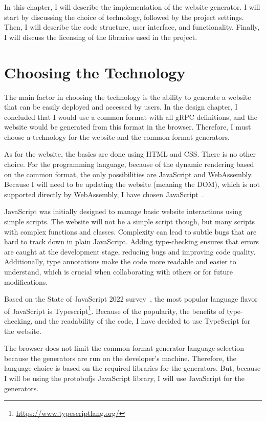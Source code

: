 In this chapter, I will describe the implementation of the website generator.
I will start by discussing the choice of technology, followed by the project settings.
Then, I will describe the code structure, user interface, and functionality.
Finally, I will discuss the licensing of the libraries used in the project.


\section{Choosing the Technology}
The main factor in choosing the technology is the ability to generate a website that can be easily deployed and accessed by users.
In the design chapter, I concluded that I would use a common format with all gRPC definitions, and the website would be generated from this format in the browser.
Therefore, I must choose a technology for the website and the common format generators.

As for the website, the basics are done using HTML and CSS\@.
There is no other choice.
For the programming language, because of the dynamic rendering based on the common format, the only possibilities are JavaScript and WebAssembly.
Because I will need to be updating the website (meaning the DOM), which is not supported directly by WebAssembly, I have chosen JavaScript~\cite{webassembly-dom}.

JavaScript was initially designed to manage basic website interactions using simple scripts.
The website will not be a simple script though, but many scripts with complex functions and classes.
Complexity can lead to subtle bugs that are hard to track down in plain JavaScript.
Adding type-checking ensures that errors are caught at the development stage, reducing bugs and improving code quality.
Additionally, type annotations make the code more readable and easier to understand, which is crucial when collaborating with others or for future modifications.
\cite{typescript-why-create}

Based on the State of JavaScript 2022 survey~\cite{state-of-js-other-tools}, the most popular language flavor of JavaScript is Typescript\footnote{\url{https://www.typescriptlang.org/}}.
Because of the popularity, the benefits of type-checking, and the readability of the code, I have decided to use TypeScript for the website.

The browser does not limit the common format generator language selection because the generators are run on the developer's machine.
Therefore, the language choice is based on the required libraries for the generators.
But, because I will be using the protobufjs JavaScript library, I will use JavaScript for the generators.

